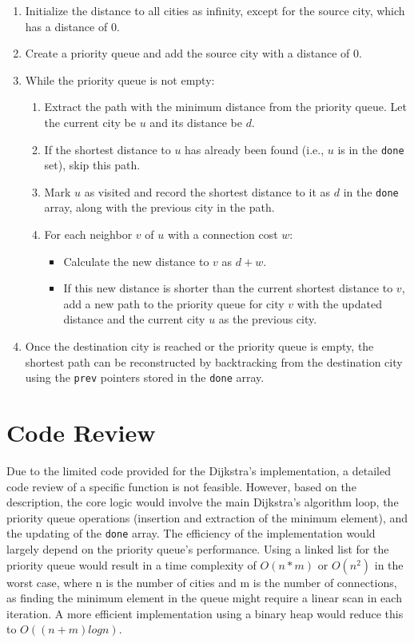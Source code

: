 \documentclass[a4paper,11pt]{article}
\begin{document}
\begin{enumerate}
    \item Initialize the distance to all cities as infinity, except for the source city, which has a distance of 0.
    \item Create a priority queue and add the source city with a distance of 0.
    \item While the priority queue is not empty:
    \begin{enumerate}
        \item Extract the path with the minimum distance from the priority queue. Let the current city be $u$ and its distance be $d$.
        \item If the shortest distance to $u$ has already been found (i.e., $u$ is in the \texttt{done} set), skip this path.
        \item Mark $u$ as visited and record the shortest distance to it as $d$ in the \texttt{done} array, along with the previous city in the path.
        \item For each neighbor $v$ of $u$ with a connection cost $w$:
        \begin{itemize}
            \item Calculate the new distance to $v$ as $d + w$.
            \item If this new distance is shorter than the current shortest distance to $v$, add a new path to the priority queue for city $v$ with the updated distance and the current city $u$ as the previous city.
        \end{itemize}
    \end{enumerate}
    \item Once the destination city is reached or the priority queue is empty, the shortest path can be reconstructed by backtracking from the destination city using the \texttt{prev} pointers stored in the \texttt{done} array.
\end{enumerate}

\section*{Code Review}
Due to the limited code provided for the Dijkstra's implementation, a detailed code review of a specific function is not feasible. However, based on the description, the core logic would involve the main Dijkstra's algorithm loop, the priority queue operations (insertion and extraction of the minimum element), and the updating of the \texttt{done} array. The efficiency of the implementation would largely depend on the priority queue's performance. Using a linked list for the priority queue would result in a time complexity of $O(n*m)$ or $O(n^2)$ in the worst case, where n is the number of cities and m is the number of connections, as finding the minimum element in the queue might require a linear scan in each iteration. A more efficient implementation using a binary heap would reduce this to $O((n+m)log n)$.
\end{document}
